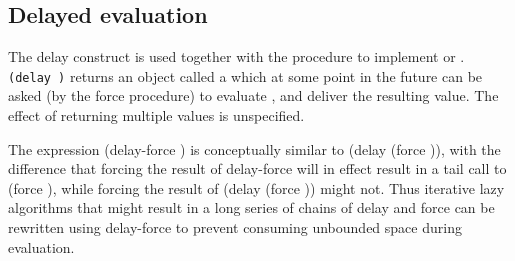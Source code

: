 \subsection{Delayed evaluation}\unsection

\begin{entry}{%
}


\semantics
The {\cf delay} construct is used together with the procedure  to
implement  or .
{\tt(delay~)} returns an object called a
 which at some point in the future can be asked (by
the {\cf force} procedure) to evaluate
, and deliver the resulting value.
The effect of  returning multiple values
is unspecified.

\end{entry}

\begin{entry}{%
}


\semantics
The expression {\cf (delay-force )} is conceptually similar to 
{\cf (delay (force ))},
with the difference that forcing the result
of {\cf delay-force} will in effect result in a tail call to 
{\cf (force )},
while forcing the result of
{\cf (delay (force ))}
might not.  Thus
iterative lazy algorithms that might result in a long series of chains of
{\cf delay} and {\cf force}
can be rewritten using {\cf delay-force} to prevent consuming
unbounded space during evaluation.

\end{entry}

